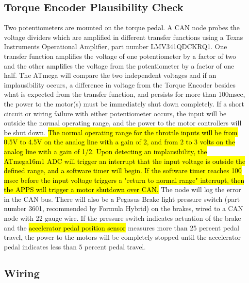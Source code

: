 \documentclass{article}
\DeclareRobustCommand{\hlr}[1]{{\sethlcolor{pink}\hl{#1}}}
\begin{document}
\subsection{Torque Encoder Plausibility Check}\label{torque_encoder_plausibility_check}

Two potentiometers are mounted on the torque pedal. A CAN node probes the voltage dividers which are amplified in different transfer functions using a Texas Instruments Operational Amplifier, part number LMV341QDCKRQ1. One transfer function amplifies the voltage of one potentiometer by a factor of two and the other amplifies the voltage from the potentiometer by a factor of one half. The ATmega will compare the two independent voltages and if an implausibility occurs, a difference in voltage from the Torque Encoder besides what is expected from the transfer function, and persists for more than 100msec, the power to the motor(s) must be immediately shut down completely. If a short circuit or wiring failure with either potentiometer occurs, the input will be outside the normal operating range, and the power to the motor controllers will be shut down. \hlr{The normal operating range for the throttle inputs will be from 0.5V to 4.5V on the analog line with a gain of 2, and from 2 to 3 volts on the analog line with a gain of 1/2. Upon detecting an implausibility, the ATmega16m1 ADC will trigger an interrupt that the input voltage is outside the defined range, and a software timer will begin. If the software timer reaches 100 msec before the input voltage triggers a "return to normal range" interrupt, then the APPS will trigger a motor shutdown over CAN.} The node will log the error in the CAN bus. There will also be a Pegasus Brake light pressure switch (part number 3601, recommended by Formula Hybrid) on the brakes, wired to a CAN node with 22 gauge wire. If the pressure switch indicates actuation of the brake and the \hlr{accelerator pedal position sensor} measures more than 25 percent pedal travel, the power to the motors will be completely stopped until the accelerator pedal indicates less than 5 percent pedal travel. 

\subsection{Wiring}
\end{document}
